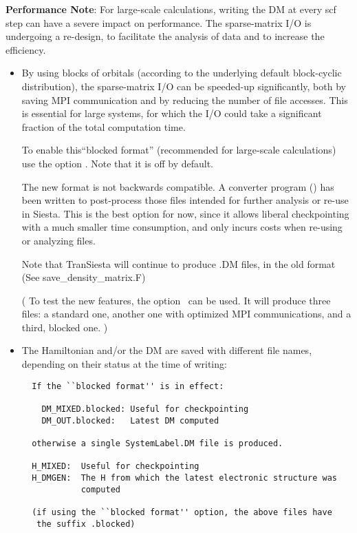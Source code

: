 \textbf{Performance Note}: For large-scale calculations, writing the DM
at every scf step can have a severe impact on performance. 
The sparse-matrix I/O is undergoing a re-design, to facilitate the
analysis of data and to increase the efficiency. 

\begin{itemize}  

\item By using blocks of orbitals (according to the underlying default
block-cyclic distribution), the sparse-matrix I/O can be speeded-up
significantly, both by saving MPI communication and by reducing the
number of file accesses. This is essential for large systems, for
which the I/O could take a significant fraction of the total
computation time.
  
To enable this``blocked format'' (recommended for large-scale
calculations) use the option  \fdftrue. Note that
it is off by default.
  
The new format is not backwards compatible. A converter program
() has been written to post-process
those files intended for further analysis or re-use in Siesta. This is
the best option for now, since it allows liberal checkpointing with a
much smaller time consumption, and only incurs costs when re-using or
analyzing files.
  
Note that TranSiesta will continue to produce .DM files, in the old
format (See save\_density\_matrix.F)

( To test the new features, the option  \fdftrue\ can be used. It
will produce three files: a standard one, another one with optimized
MPI communications, and a third, blocked one.  )

\item The Hamiltonian and/or the DM are saved with different file
  names, depending on their status at the time of writing:

\begin{verbatim}  
  If the ``blocked format'' is in effect:

    DM_MIXED.blocked: Useful for checkpointing
    DM_OUT.blocked:   Latest DM computed
  
  otherwise a single SystemLabel.DM file is produced.
  
  H_MIXED:  Useful for checkpointing
  H_DMGEN:  The H from which the latest electronic structure was
            computed

  (if using the ``blocked format'' option, the above files have
   the suffix .blocked)


\end{verbatim}
\end{itemize}
